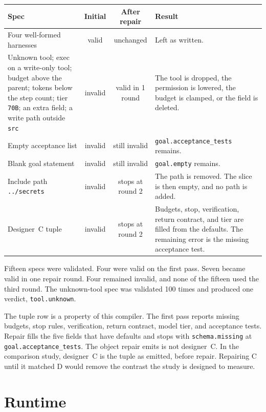 \documentclass[10pt,a4paper]{article}
\begin{document}
\begin{table}[H]
\centering
\footnotesize
\begin{tabularx}{\textwidth}{@{}YccY@{}}
\toprule
Spec & Initial & After repair & Result \\
\midrule
Four well-formed harnesses & valid & unchanged & Left as written. \\
Unknown tool; exec on a write-only tool; budget above the parent; tokens below the step count; tier \texttt{70B}; an extra field; a write path outside \texttt{src} & invalid & valid in 1 round & The tool is dropped, the permission is lowered, the budget is clamped, or the field is deleted. \\
Empty acceptance list & invalid & still invalid & \texttt{goal.acceptance\_tests} remains. \\
Blank goal statement & invalid & still invalid & \texttt{goal.empty} remains. \\
Include path \texttt{../secrets} & invalid & stops at round 2 & The path is removed. The slice is then empty, and no path is added. \\
Designer~C tuple & invalid & stops at round 2 & Budgets, stop, verification, return contract, and tier are filled from the defaults. The remaining error is the missing acceptance test. \\
\bottomrule
\end{tabularx}
\end{table}

Fifteen specs were validated. Four were valid on the first pass. Seven became valid in one repair round. Four remained invalid, and none of the fifteen used the third round. The unknown-tool spec was validated 100 times and produced one verdict, \texttt{tool.unknown}.

The tuple row is a property of this compiler. The first pass reports missing budgets, stop rules, verification, return contract, model tier, and acceptance tests. Repair fills the five fields that have defaults and stops with \texttt{schema.missing} at \texttt{goal.acceptance\_tests}. The object repair emits is not designer~C. In the comparison study, designer~C is the tuple as emitted, before repair. Repairing C until it matched D would remove the contrast the study is designed to measure.

\section{Runtime}
\label{sec:runtime}
\end{document}
